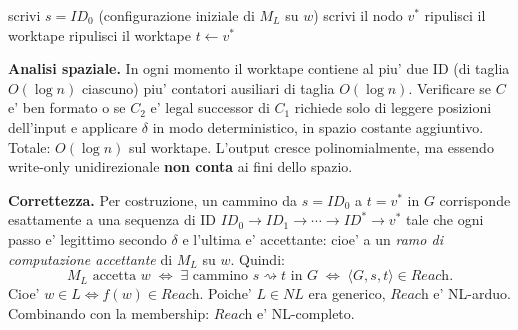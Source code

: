 {  \begin{algorithm}[H]
    \DontPrintSemicolon
    \caption{Trasduttore $f$: costruzione di $\langle G, s, t\rangle$ in logspace}
    scrivi $s = \mathit{ID}_0$ (configurazione iniziale di $M_L$ su $w$)\;
    \BlankLine
    scrivi il nodo $v^*$\;
    \BlankLine
    ripulisci il worktape\;
    \BlankLine
    ripulisci il worktape\;
    $t \leftarrow v^*$\;
  \end{algorithm}

  \textbf{Analisi spaziale.} In ogni momento il worktape contiene al piu' due ID (di taglia $O(\log n)$ ciascuno) piu' contatori ausiliari di taglia $O(\log n)$. Verificare se $C$ e' ben formato o se $C_2$ e' legal successor di $C_1$ richiede solo di leggere posizioni dell'input e applicare $\delta$ in modo deterministico, in spazio costante aggiuntivo. Totale: $O(\log n)$ sul worktape. L'output cresce polinomialmente, ma essendo write-only unidirezionale \textbf{non conta} ai fini dello spazio.

  \textbf{Correttezza.} Per costruzione, un cammino da $s = \mathit{ID}_0$ a $t = v^*$ in $G$ corrisponde esattamente a una sequenza di ID $\mathit{ID}_0 \to \mathit{ID}_1 \to \cdots \to \mathit{ID}^* \to v^*$ tale che ogni passo e' legittimo secondo $\delta$ e l'ultima e' accettante: cioe' a un \emph{ramo di computazione accettante} di $M_L$ su $w$. Quindi:
  \[
    M_L \text{ accetta } w \;\iff\; \exists \text{ cammino } s \rightsquigarrow t \text{ in } G \;\iff\; \langle G, s, t\rangle \in \textit{Reach}.
  \]
  Cioe' $w \in L \iff f(w) \in \textit{Reach}$. Poiche' $L \in NL$ era generico, $\textit{Reach}$ e' NL-arduo. Combinando con la membership: $\textit{Reach}$ e' NL-completo.
}


